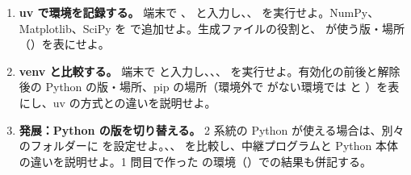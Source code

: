 \begin{enumerate}
\item \textbf{uv で環境を記録する。}
端末で 、 と入力し、、 を実行せよ。NumPy、Matplotlib、SciPy を  で追加せよ。生成ファイルの役割と、 が使う版・場所（）を表にせよ。

\item \textbf{venv と比較する。}
端末で  と入力し、、、 を実行せよ。有効化の前後と解除後の Python の版・場所、pip の場所（環境外で  がない環境では  と ）を表にし、uv の方式との違いを説明せよ。

\item \textbf{発展：Python の版を切り替える。}
2 系統の Python が使える場合は、別々のフォルダーに  を設定せよ。、、 を比較し、中継プログラムと Python 本体の違いを説明せよ。1 問目で作った  の環境（）での結果も併記する。
\end{enumerate}
